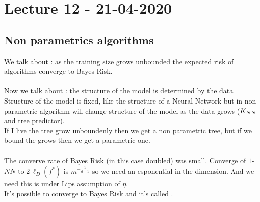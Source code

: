 \documentclass[../main.tex]{subfiles}
\begin{document}
\chapter{Lecture 12 - 21-04-2020}

\section{Non parametrics algorithms}

We talk about : as the training size grows unbounded the expected risk of algorithms converge to Bayes Risk.
\\\\
Now we talk about : the structure of the model is determined by the data.\\
Structure of the model is fixed, like the structure of a Neural Network but in non parametric algorithm will change structure of the model as the data grows ($K_{NN}$ and tree predictor).\\
If I live the tree grow unboundenly then we get a non parametric tree, but if we bound the grows then we get a parametric one.
\\\\
The converve rate of Bayes Risk (in this case doubled) was small.
Converge of $1$-$NN$ to $2 \, \ell_D(f^*)$ is $m^{-\frac{1}{d+1}}$ so we need an esponential  in the dimension. And we need this is under Lips assumption of $\eta$.
\\ It's possible to converge to Bayes Risk and it's called .
\end{document}
